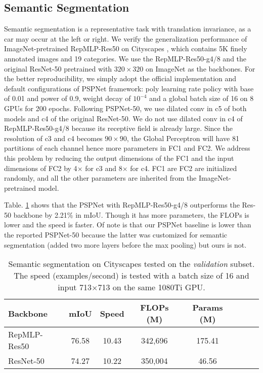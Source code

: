 \documentclass[10pt,twocolumn,letterpaper]{article}
\begin{document}
\subsection{Semantic Segmentation}

Semantic segmentation is a representative task with translation invariance, as a car may occur at the left or right. We verify the generalization performance of ImageNet-pretrained RepMLP-Res50 on Cityscapes \cite{cityscapes}, which contains 5K finely annotated images and 19 categories. We use the RepMLP-Res50-g4/8 and the original ResNet-50 pretrained with $320\times320$ on ImageNet as the backbones. For the better reproducibility, we simply adopt the official implementation and default configurations \cite{official-pspnet} of PSPNet \cite{pspnet} framework: poly learning rate policy with base of 0.01 and power of 0.9, weight decay of $10^{-4}$ and a global batch size of 16 on 8 GPUs for 200 epochs. Following PSPNet-50, we use dilated conv in c5 of both models and c4 of the original ResNet-50. We do not use dilated conv in c4 of RepMLP-Res50-g4/8 because its receptive field is already large. Since the resolution of c3 and c4 becomes $90\times90$, the Global Perceptron will have 81 partitions of each channel hence more parameters in FC1 and FC2. We address this problem by reducing the output dimensions of the FC1 and the input dimensions of FC2 by 4$\times$ for c3 and 8$\times$ for c4. FC1 are FC2 are initialized randomly, and all the other parameters are inherited from the ImageNet-pretrained model.

Table. \ref{table-seg} shows that the PSPNet with RepMLP-Res50-g4/8 outperforms the Res-50 backbone by 2.21\% in mIoU. Though it has more parameters, the FLOPs is lower and the speed is faster. Of note is that our PSPNet baseline is lower than the reported PSPNet-50 because the latter was customized for semantic segmentation (added two more layers before the max pooling) but ours is not.

\setlength{\tabcolsep}{4pt}
\begin{table}
	\caption{Semantic segmentation on Cityscapes \cite{cityscapes} tested on the \textit{validation} subset. The speed (examples/second) is tested with a batch size of 16 and input 713$\times$713 on the same 1080Ti GPU.}
	\label{table-seg}
	\vspace{-0.2in}
	\begin{center}
		\small
		\begin{tabular}{lccccccc}
			\hline
			Backbone				&	mIoU	&	Speed	&	FLOPs (M)	&	Params (M)	\\
			\hline
			RepMLP-Res50			&	76.58		&	10.43	&	342,696		&	175.41	\\
			ResNet-50				&	74.27		&	10.22	&	350,004		&	46.56		\\
			\hline
		\end{tabular}
	\end{center}
	\vspace{-0.1in}
\end{table}
\setlength{\tabcolsep}{1.4pt}
\end{document}
